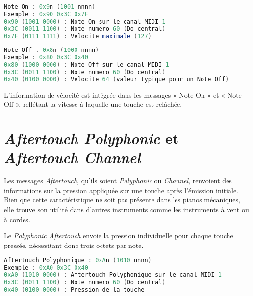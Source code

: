 \documentclass[a4paper]{report}
\begin{document}
\begin{minipage}{\linewidth}
\begin{lstlisting}[language=GLSL, caption=\textit{Note On},captionpos=b,frame=single] 
Note On : 0x9n (1001 nnnn)
Exemple : 0x90 0x3C 0x7F
0x90 (1001 0000) : Note On sur le canal MIDI 1
0x3C (0011 1100) : Note numero 60 (Do central)
0x7F (0111 1111) : Velocite maximale (127)
\end{lstlisting}
\end{minipage}

\begin{minipage}{\linewidth}
\begin{lstlisting}[language=GLSL, caption=\textit{Note Off},captionpos=b,frame=single] 
Note Off : 0x8n (1000 nnnn)
Exemple : 0x80 0x3C 0x40
0x80 (1000 0000) : Note Off sur le canal MIDI 1
0x3C (0011 1100) : Note numero 60 (Do central)
0x40 (0100 0000) : Velocite 64 (valeur typique pour un Note Off)
\end{lstlisting}
\end{minipage}


L'information de vélocité est intégrée dans les messages « Note On » et « Note Off », reflétant la vitesse à laquelle une touche est relâchée.

\section*{\textit{Aftertouch Polyphonic} et \textit{Aftertouch Channel}}

Les messages \textit{Aftertouch}, qu'ils soient \textit{Polyphonic} ou \textit{Channel}, renvoient des informations sur la pression appliquée sur une touche après l'émission initiale. Bien que cette caractéristique ne soit pas présente dans les pianos mécaniques, elle trouve son utilité dans d'autres instruments comme les instruments à vent ou à cordes. 

Le \textit{Polyphonic Aftertouch} envoie la pression individuelle pour chaque touche pressée, nécessitant donc trois octets par note.

\begin{minipage}{\linewidth}
\begin{lstlisting}[language=GLSL, caption=\textit{Aftertouch} Polyphonique,captionpos=b,frame=single] 
Aftertouch Polyphonique : 0xAn (1010 nnnn)
Exemple : 0xA0 0x3C 0x40
0xA0 (1010 0000) : Aftertouch Polyphonique sur le canal MIDI 1
0x3C (0011 1100) : Note numero 60 (Do central)
0x40 (0100 0000) : Pression de la touche
\end{lstlisting}
\end{minipage}
\end{document}
